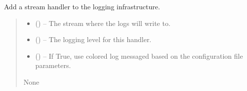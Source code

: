 \documentclass[letterpaper,11pt,english]{sphinxmanual}
\begin{document}

\begin{savenotes}\begin{fulllineitems}
\label{\detokenize{code/lezargus.library.logging:lezargus.library.logging.add_stream_logging_handler}}
\pysigstartsignatures
{}
\pysigstopsignatures
\sphinxAtStartPar
Add a stream handler to the logging infrastructure.
\begin{quote}\begin{description}
\begin{itemize}
\item {} 
\sphinxAtStartPar
{} () – The stream where the logs will write to.

\item {} 
\sphinxAtStartPar
{} () – The logging level for this handler.

\item {} 
\sphinxAtStartPar
{} () – If True, use colored log messaged based on the configuration file
parameters.

\end{itemize}

\sphinxAtStartPar
None

\end{description}\end{quote}

\end{fulllineitems}\end{savenotes}
\end{document}
